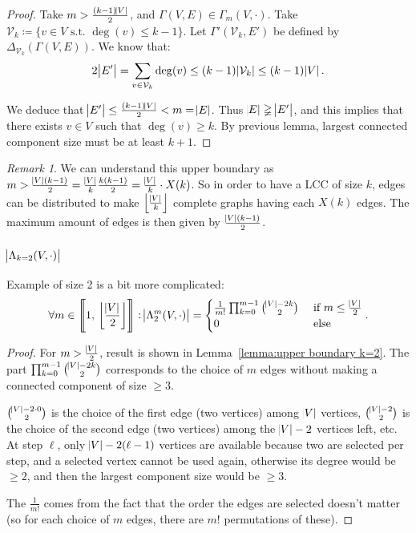 \documentclass{article}
\theoremstyle{definition}
\theoremstyle{remark}
\newtheorem*{remark}{Remark}
\newcommand{\intint}[2]{\left\llbracket#1, \, #2\right\rrbracket}
\newcommand{\floor}[1]{\left\lfloor#1\right\rfloor}
\newcommand{\st}{\text{ s.t. }}
\begin{document}
			\begin{proof} Take $m > \frac {(k-1)\abs V}2$, and $\Gamma(V, E) \in \Gamma_m(V, \cdot)$. Take $\mathcal V_k \coloneqq \{v \in V \st \deg(v) \leq k-1\}$.
			Let $\Gamma'(\mathcal V_k, E')$ be defined by $\Delta_{\mathcal V_k}(\Gamma(V, E))$. We know that:
			\[2\abs {E'} = \sum_{v \in \mathcal V_k}\deg(v) \leq (k-1)\abs {\mathcal V_k} \leq (k-1)\abs V.\]

			We deduce that $\abs {E'} \leq \frac {(k-1)\abs V}2 < m = \abs E$. Thus $\abs E \gneqq \abs {E'}$, and this implies that there exists $v \in V$ such that $\deg(v) \geq k$.
			By previous lemma, largest connected component size must be at least $k+1$.
			\end{proof}

			\begin{remark} We can understand this upper boundary as $m > \frac {\abs V(k-1)}2 = \frac {\abs V}k\frac {k(k-1)}2 = \frac {\abs V}k \cdot X(k)$. So in
			order to have a LCC of size $k$, edges can be distributed to make $\floor {\frac {\abs V}k}$ complete graphs having each $X(k)$ edges.
			The maximum amount of edges is then given by $\frac {\abs V(k-1)}2$.
			\end{remark}

		\subsubsection{$\abs {\Lambda_{k=2}(V, \cdot)}$}
			Example of size 2 is a bit more complicated:
			\[\forall m \in \intint 1{\floor {\frac {\abs V}2}} : \abs {\Lambda_2^m(V, \cdot)} = \begin{cases}
				\frac 1{m!}\prod_{k=0}^{m-1}\binom {\abs V-2k}2 &\text{ if } m \leq \frac {\abs V}2 \\
				0 &\text{ else}
			\end{cases}.\]

			\begin{proof} For $m > \frac {\abs V}2$, result is shown in Lemma~\ref{lemma:upper boundary k=2}. The part $\prod_{k=0}^{m-1}\binom {\abs V-2k}2$ corresponds
			to the choice of $m$ edges without making a connected component of size $\geq 3$.

			$\binom {\abs V-2 \cdot 0}2$ is the choice of the first edge (two vertices) among $\abs V$ vertices, $\binom {\abs V-2}2$ is the choice of the second edge
			(two vertices) among the $\abs V-2$ vertices left, etc. At step $\ell$, only $\abs V-2(\ell-1)$ vertices are available because two are selected per step, and
			a selected vertex cannot be used again, otherwise its degree would be $\geq 2$, and then the largest component size would be $\geq 3$.

			The $\frac 1{m!}$ comes from the fact that the order the edges are selected doesn't matter (so for each choice of $m$ edges, there are $m!$ permutations
			of these).
			\end{proof}
\end{document}
